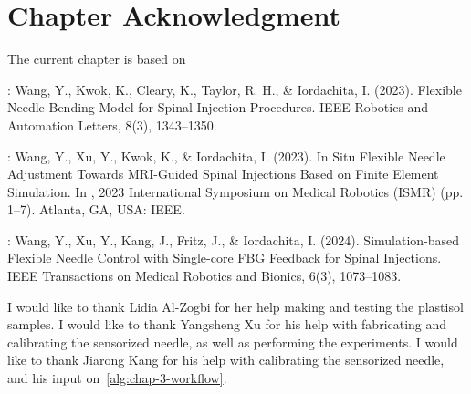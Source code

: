\section{Chapter Acknowledgment}
\label{sec:chap-3-ack}
The current chapter is based on

\parencite{wangFlexibleNeedleBending2023}: Wang, Y., Kwok, K., Cleary, K., Taylor, R. H., \& Iordachita, I. (2023). Flexible Needle Bending Model for Spinal Injection Procedures. IEEE Robotics and Automation Letters, 8(3), 1343–1350.

\parencite{wangSituFlexibleNeedle2023}: Wang, Y., Xu, Y., Kwok, K., \& Iordachita, I. (2023). In Situ Flexible Needle Adjustment Towards MRI-Guided Spinal Injections Based on Finite Element Simulation. In , 2023 International Symposium on Medical Robotics (ISMR) (pp. 1–7). Atlanta, GA, USA: IEEE.

\parencite{wangSimulationbasedFlexibleNeedle2024}: Wang, Y., Xu, Y., Kang, J., Fritz, J., \& Iordachita, I. (2024). Simulation-based Flexible Needle Control with Single-core FBG Feedback for Spinal Injections. IEEE Transactions on Medical Robotics and Bionics, 6(3), 1073–1083. 

I would like to thank Lidia Al-Zogbi for her help making and testing the plastisol samples. I would like to thank Yangsheng Xu for his help with fabricating and calibrating the sensorized needle, as well as performing the experiments. I would like to thank Jiarong Kang for his help with calibrating the sensorized needle, and his input on~\cref{alg:chap-3-workflow}.

